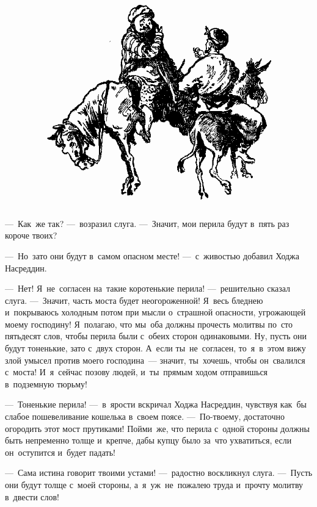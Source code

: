 \documentclass[12pt,a4paper]{book}
\begin{document}
\begin{figure}[h]
\centering
\includegraphics[width=\textwidth]{2.png}
\end{figure}

—~Как~же так? —~возразил слуга. —~Значит, мои перила будут в~пять раз короче твоих?

—~Но~зато они будут в~самом опасном месте! —~с~живостью добавил Ходжа Насреддин.

—~Нет! Я~не~согласен на~такие коротенькие перила! —~решительно сказал слуга. —~Значит, часть моста будет неогороженной! Я~весь бледнею и~покрываюсь холодным потом при мысли о~страшной опасности, угрожающей моему господину! Я~полагаю, что мы~оба должны прочесть молитвы по~сто пятьдесят слов, чтобы перила были с~обеих сторон одинаковыми. Ну, пусть они будут тоненькие, зато с~двух сторон. А~если ты~не~согласен, то~я~в~этом вижу злой умысел против моего господина~— значит, ты~хочешь, чтобы он~свалился с~моста! И~я~сейчас позову людей, и~ты~прямым ходом отправишься в~подземную тюрьму!

—~Тоненькие перила! —~в~ярости вскричал Ходжа Насреддин, чувствуя как~бы слабое пошевеливание кошелька в~своем поясе. —~По-твоему, достаточно огородить этот мост прутиками! Пойми~же, что перила с~одной стороны должны быть непременно толще и~крепче, дабы купцу было за~что ухватиться, если он~оступится и~будет падать!

—~Сама истина говорит твоими устами! —~радостно воскликнул слуга. —~Пусть они будут толще с~моей стороны, а~я~уж~не~пожалею труда и~прочту молитву в~двести слов!
\end{document}
